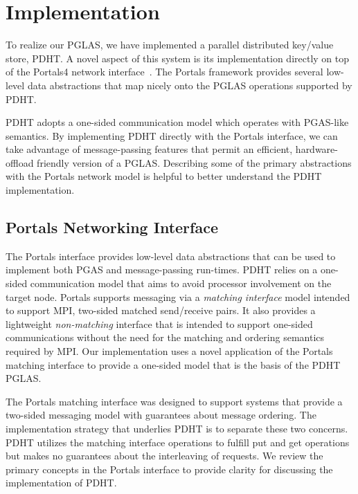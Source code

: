 \section{Implementation}

To realize our PGLAS, we have implemented a parallel distributed key/value store, 
PDHT. A novel aspect of this system is its implementation directly on top of the
Portals4 network interface~\cite{portals4}. The Portals framework provides several low-level 
data abstractions that map nicely onto the PGLAS operations supported by PDHT.

PDHT adopts a one-sided communication model which operates with PGAS-like
semantics. By implementing PDHT directly with the Portals interface, we can
take advantage of message-passing features that permit an efficient,
hardware-offload friendly version of a PGLAS. Describing
some of the primary abstractions with the Portals network model is helpful 
to better understand the PDHT implementation.

\subsection{Portals Networking Interface}


The Portals interface provides low-level data abstractions that can be used to
implement both PGAS and message-passing run-times. PDHT relies on a one-sided
communication model that aims to avoid processor involvement on the target
node. Portals supports messaging via a {\em matching interface} model intended to
support MPI, two-sided matched send/receive pairs. It also provides a
lightweight {\em non-matching} interface that is intended to support one-sided
communications without the need for the matching and ordering semantics
required by MPI. Our implementation uses a novel application of the Portals
matching interface to provide a one-sided model that is the basis of the PDHT
PGLAS. 

The Portals matching interface was designed to support systems that provide a
two-sided messaging model with guarantees about message ordering. The
implementation strategy that underlies PDHT is to separate these two concerns.
PDHT utilizes the matching interface operations to fulfill put and get
operations but makes no guarantees about the interleaving of requests. We
review the primary concepts in the Portals interface to provide clarity for
discussing the implementation of PDHT.



